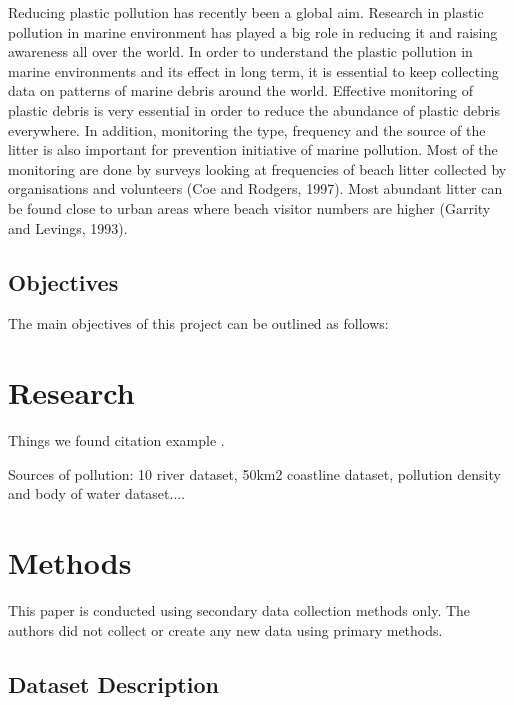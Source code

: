 \documentclass[10pt]{article}\usepackage[]{graphicx}\usepackage[]{color}
\begin{document}
Reducing plastic pollution has recently been a global aim. Research in plastic pollution in marine environment has played a big role in reducing it and raising awareness all over the world. In order to understand the plastic pollution in marine environments and its effect in long term, it is essential to keep collecting data on patterns of marine debris around the world. Effective monitoring of plastic debris is very essential in order to reduce the abundance of plastic debris everywhere. In addition, monitoring the type, frequency and the source of the litter is also important for prevention initiative of marine pollution. Most of the monitoring are done by surveys looking at frequencies of beach litter collected by organisations and volunteers (Coe and Rodgers, 1997). Most abundant litter can be found close to urban areas where beach visitor numbers are higher (Garrity and Levings, 1993). 


\subsection{Objectives }\label{obj}

The main objectives of this project can be outlined as follows: 




\section{Research}\label{research}

Things we found
citation example \cite{8489087}.

Sources of pollution: 10 river dataset, 50km2 coastline dataset, pollution density and body of water dataset....


\section {Methods}\label{methods}

This paper is conducted using secondary data collection methods only. The authors did not collect or create any new data using primary methods.


\subsection{Dataset Description}\label{dataset}
\end{document}
